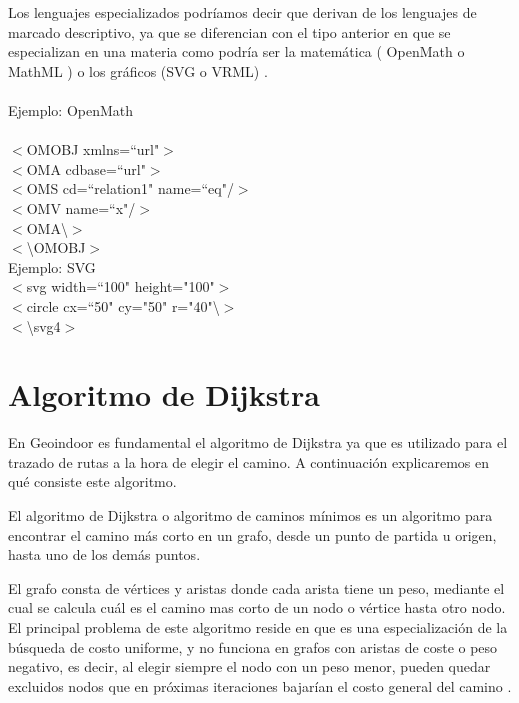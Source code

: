 Los lenguajes especializados podríamos decir que derivan de los lenguajes de marcado descriptivo, ya que se diferencian con el tipo anterior en que se especializan en una materia como podría ser la matemática ( OpenMath o MathML ) o los gráficos (SVG o VRML) \cite{openmath} \cite{xmlusos}.
\\
\\
Ejemplo: OpenMath
\\
\\
$<$OMOBJ xmlns=``url"$>$
\\
 \tab $<$OMA cdbase=``url"$>$
 \\
    \tab\tab$<$OMS cd=``relation1" name=``eq"/$>$
    \\
   \tab\tab$<$OMV name=``x"/$>$
   \\
  \tab$<$OMA\textbackslash $>$
  \\
$<$\textbackslash OMOBJ$>$
\\
Ejemplo: SVG
\\
$<$svg width=``100" height="100"$>$
\\
  \tab$<$circle cx=``50" cy="50" r="40"\textbackslash $>$
  \\
$<$\textbackslash svg4$>$
\\

\section{Algoritmo de Dijkstra}\label{Dijkstra}
En Geoindoor es fundamental el algoritmo de Dijkstra ya que es utilizado para el trazado de rutas a la hora de elegir el camino.
A continuación explicaremos en qué consiste este algoritmo.

El algoritmo de Dijkstra o algoritmo de caminos mínimos es un algoritmo para encontrar el camino más corto en un grafo, desde un punto de partida u origen, hasta uno de los demás puntos.

El grafo consta de vértices y aristas donde cada arista tiene un peso, mediante el cual se calcula cuál es el camino mas corto de un nodo o vértice hasta otro nodo. El principal problema de este algoritmo reside en que es una especialización de la búsqueda de costo uniforme, y no funciona en grafos con aristas de coste o peso negativo, es decir, al elegir siempre el nodo con un peso menor, pueden quedar excluidos nodos que en próximas iteraciones bajarían el costo general del camino \cite{dijkstrabib}. 
\\
\\
